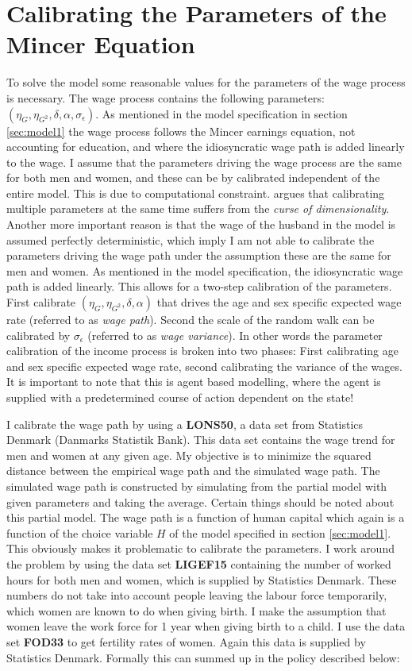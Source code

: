\section{Calibrating the Parameters of the Mincer Equation}


To solve the model some reasonable values for the parameters of the wage process is necessary. The wage process contains the following parameters: $(\eta_G, \eta_{G^2}, \delta, \alpha, \sigma_{\epsilon})$. As mentioned in the model specification in section \ref{sec:model1} the wage process follows the Mincer earnings equation, not accounting for education, and where the idiosyncratic wage path is added linearly to the wage. I assume that the parameters driving the wage process are the same for both men and women, and these can be by calibrated independent of the entire model. This is due to computational constraint. \textcite{friedman_elements_2001} argues that calibrating multiple parameters at the same time suffers from the \textit{curse of dimensionality}. Another more important reason is that the wage of the husband in the model is assumed perfectly deterministic, which imply I am not able to calibrate the parameters driving the wage path under the assumption these are the same for men and women. As mentioned in the model specification, the idiosyncratic wage path is added linearly. This  allows for a two-step calibration of the parameters. First calibrate $(\eta_G, \eta_{G^2}, \delta, \alpha)$ that drives the age and sex specific expected wage rate (referred to as \textit{wage path}). Second the scale of the random walk can be calibrated by $\sigma_\epsilon$ (referred to as \textit{wage variance}). In other words the parameter calibration of the income process is broken into two phases: First calibrating age and sex specific expected wage rate, second calibrating the variance of the wages. It is important to note that this is agent based modelling, where the agent is supplied with a predetermined course of action dependent on the state! 

I calibrate the wage path by using a \textbf{LONS50}, a data set from Statistics Denmark (Danmarks Statistik Bank). This data set contains the wage trend for men and women at any given age. My objective is to minimize the squared distance between the empirical wage path and the simulated wage path. The simulated wage path is constructed by simulating from the partial model with given parameters and taking the average. Certain things should be noted about this partial model. The wage path is a function of human capital which again is a function of the choice variable $H$ of the model specified in section \ref{sec:model1}. This obviously makes it problematic to calibrate the parameters. I work around the problem by using the data set \textbf{LIGEF15} containing the number of worked hours for both men and women, which is supplied by Statistics Denmark. These numbers do not take into account people leaving the labour force temporarily, which women are known to do when giving birth. I make the assumption that women leave the work force for 1 year when giving birth to a child. I use the data set \textbf{FOD33} to get fertility rates of women. Again this data is supplied by Statistics Denmark. Formally this can summed up in the policy described below:

